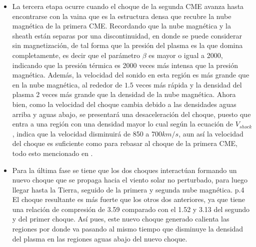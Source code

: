 \begin{itemize}
\begin{itemize}
\item La tercera etapa ocurre cuando el choque de la segunda \ac{CME} avanza hasta encontrarse con la vaina que es la estructura densa que recubre la nube magnética de la primera CME. Recordando que la nube magnética y la sheath están separas por una discontinuidad, en donde se puede considerar sin magnetización, de tal forma que la presión del plasma es la que domina completamente, es decir que el parámetro \hyperref[beta]{$\beta$} es mayor o igual a 2000, indicando que la presión térmica es 2000 veces más intensa que la presión magnética.
Además, la velocidad del sonido en esta región es más grande que en la nube magnética, al rededor de $1.5$ veces más rápida y la densidad del plasma 2 veces más grande que la densidad de la nube magnética. Ahora bien, como la velocidad del choque cambia debido a las densidades aguas arriba y aguas abajo, se presentará una desaceleración del choque, puesto que entra a una región con una densidad mayor lo cual según la ecuación de \hyperref[Vshock]{$V_{shock}$}, indica que la velocidad disminuirá de 850 a 700$km/s$, aun así la velocidad del choque es suficiente como para rebasar al choque de la primera CME, todo esto mencionado en \cite{lugaz-2005}.

\item Para la última fase se tiene que los dos choques interactúan formando un nuevo choque que se propaga hacia el viento solar no perturbado, para luego llegar hasta la Tierra, seguido de la primera y segunda nube magnética. p.4
El choque resultante es más fuerte que los otros dos anteriores, ya que tiene una relación de compresión de 3.59 comparado con el 1.52 y 3.13 del segundo y del primer choque. Así pues, este nuevo choque generado calienta las regiones por donde va pasando al mismo tiempo que disminuye la densidad del plasma en las regiones aguas abajo del nuevo choque.
\end{itemize}


\end{itemize}
